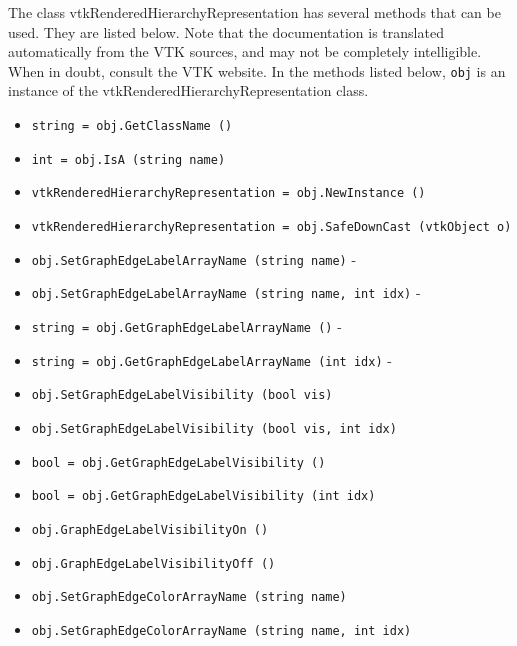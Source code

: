 The class vtkRenderedHierarchyRepresentation has several methods that can be used.
  They are listed below.
Note that the documentation is translated automatically from the VTK sources,
and may not be completely intelligible.  When in doubt, consult the VTK website.
In the methods listed below, \verb|obj| is an instance of the vtkRenderedHierarchyRepresentation class.
\begin{itemize}
\item  \verb|string = obj.GetClassName ()|

\item  \verb|int = obj.IsA (string name)|

\item  \verb|vtkRenderedHierarchyRepresentation = obj.NewInstance ()|

\item  \verb|vtkRenderedHierarchyRepresentation = obj.SafeDownCast (vtkObject o)|

\item  \verb|obj.SetGraphEdgeLabelArrayName (string name)| -  

\item  \verb|obj.SetGraphEdgeLabelArrayName (string name, int idx)| -  

\item  \verb|string = obj.GetGraphEdgeLabelArrayName ()| -  

\item  \verb|string = obj.GetGraphEdgeLabelArrayName (int idx)| -  

\item  \verb|obj.SetGraphEdgeLabelVisibility (bool vis)|

\item  \verb|obj.SetGraphEdgeLabelVisibility (bool vis, int idx)|

\item  \verb|bool = obj.GetGraphEdgeLabelVisibility ()|

\item  \verb|bool = obj.GetGraphEdgeLabelVisibility (int idx)|

\item  \verb|obj.GraphEdgeLabelVisibilityOn ()|

\item  \verb|obj.GraphEdgeLabelVisibilityOff ()|

\item  \verb|obj.SetGraphEdgeColorArrayName (string name)|

\item  \verb|obj.SetGraphEdgeColorArrayName (string name, int idx)|


\end{itemize}
